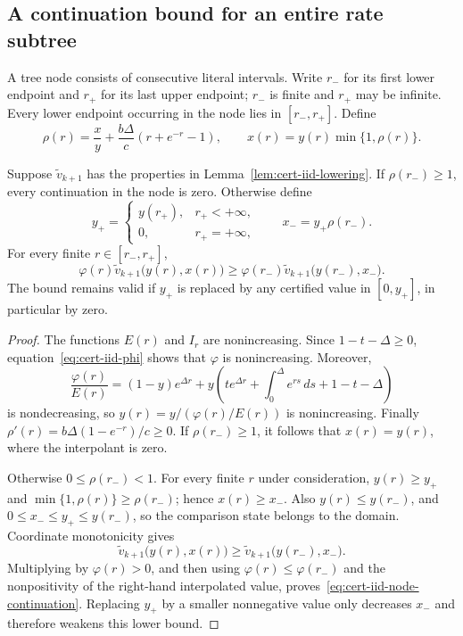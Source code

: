 \subsection{A continuation bound for an entire rate subtree}
\label{sec:cert-iid-continuation}

A tree node consists of consecutive literal intervals.  Write $r_-$ for
its first lower endpoint and $r_+$ for its last upper endpoint; $r_-$ is
finite and $r_+$ may be infinite.  Every lower endpoint occurring in the
node lies in $[r_-,r_+]$.  Define
\[
 \rho(r)=\frac{x}{y}+\frac{b\Delta}{c}(r+e^{-r}-1),
 \qquad x(r)=y(r)\min\{1,\rho(r)\}.
\]

\begin{lemma}
\label{lem:cert-iid-continuation}
Suppose $\widetilde v_{k+1}$ has the properties in
Lemma~\ref{lem:cert-iid-lowering}.  If $\rho(r_-)\ge1$, every continuation in
the node is zero.  Otherwise define
\[
 y_+=\begin{cases}y(r_+),&r_+<+\infty,\\0,&r_+=+\infty,\end{cases}
 \qquad x_-=y_+\rho(r_-).
\]
For every finite $r\in[r_-,r_+]$,
\begin{equation}
 \varphi(r)\widetilde v_{k+1}\bigl(y(r),x(r)\bigr)
 \ge
 \varphi(r_-)\widetilde v_{k+1}\bigl(y(r_-),x_-\bigr).
 \label{eq:cert-iid-node-continuation}
\end{equation}
The bound remains valid if $y_+$ is replaced by any certified value in
$[0,y_+]$, in particular by zero.
\end{lemma}
\begin{proof}
The functions $E(r)$ and $I_r$ are nonincreasing.  Since
$1-t-\Delta\ge0$, equation~\eqref{eq:cert-iid-phi} shows that
$\varphi$ is nonincreasing.  Moreover,
\[
 \frac{\varphi(r)}{E(r)}
 =(1-y)e^{\Delta r}
  +y\left(te^{\Delta r}+\int_0^\Delta e^{rs}\,ds+1-t-\Delta\right)
\]
is nondecreasing, so $y(r)=y/(\varphi(r)/E(r))$ is nonincreasing.
Finally $\rho'(r)=b\Delta(1-e^{-r})/c\ge0$.
If $\rho(r_-)\ge1$, it follows that $x(r)=y(r)$, where the interpolant is
zero.

Otherwise $0\le \rho(r_-)<1$.  For every finite $r$ under consideration,
$y(r)\ge y_+$ and $\min\{1,\rho(r)\}\ge \rho(r_-)$; hence
$x(r)\ge x_-$.  Also $y(r)\le y(r_-)$, and
$0\le x_-\le y_+\le y(r_-)$, so the comparison state belongs to the
domain.  Coordinate monotonicity gives
\[
 \widetilde v_{k+1}\bigl(y(r),x(r)\bigr)
 \ge \widetilde v_{k+1}\bigl(y(r_-),x_-\bigr).
\]
Multiplying by $\varphi(r)>0$, and then using
$\varphi(r)\le\varphi(r_-)$ and the nonpositivity of the right-hand
interpolated value, proves~\eqref{eq:cert-iid-node-continuation}.
Replacing $y_+$ by a smaller nonnegative value only decreases $x_-$ and
therefore weakens this lower bound.
\end{proof}

